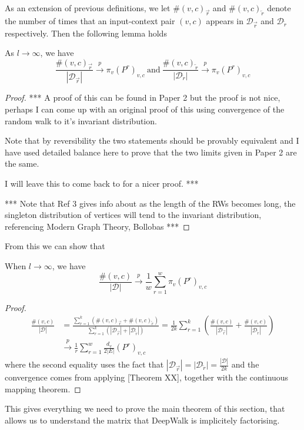 \documentclass[a4paper]{article}
\newcommand{\D}{\mathcal D}
\newcommand{\rar}{\overrightarrow r}
\newcommand{\lar}{\overleftarrow r}
\begin{document}
As an extension of previous definitions, we let $\#(v, c)_{\rar}$ and $\#(v,
c)_{\lar}$ denote the number of times that an input-context pair $(v,c)$ appears
in $\D_{\rar}$ and $\D_{\lar}$ respectively. Then the following lemma holds
\begin{lemma}
  As $l \to \infty$, we have
  \[\frac{\#(v, c)_{\rar}}{|\D_{\rar}|} \overset{p}{\to} \pi_v(P^r)_{v,c} \  \text{and}
    \ \frac{\#(v, c)_{\lar}}{|\D_{\lar}|} \overset{p}{\to} \pi_v(P^r)_{v,c} \]
\end{lemma}
\begin{proof}
  ***
  A proof of this can be found in Paper 2 but the proof is not nice, perhaps I can
  come up with an original proof of this using convergence of the random walk to
  it's invariant distribution.

  Note that by reversibility the two statements should be provably equivalent and
  I have used detailed balance here to prove that the two limits given in Paper 2
  are the same.

  I will leave this to come back to for a nicer proof.
  ***


  *** Note that Ref 3 gives info about as the length of the RWs becomes long, the
  singleton distribution of vertices will tend to the invariant distribution,
  referencing Modern Graph Theory, Bollobas ***
\end{proof}
From this we can show that
\begin{lemma}
  When $l \to \infty$, we have
  \[\frac{\#(v, c)}{|\D|} \overset{p}{\to} \frac{1}{w} \sum_{r = 1}^w \pi_v
    (P^r)_{v,c}\]
\end{lemma}
\begin{proof}
  \begin{align*}
    \frac{\#(v, c)}{|\D|} &=  \frac{\sum_{r=1}^k (\#(v, c)_{\rar} + \#(v, c)_{\lar})}{\sum_{r=1}^k (|\D_{\rar}| + |\D_{\lar}|)} = \frac{1}{2k} \sum_{r=1}^k \left( \frac{\#(v, c)}{|\D_{\rar}|} + \frac{\#(v, c)}{|\D_{\lar}|} \right)\\
                          &\overset{p}{\to} \frac{1}{r}\sum_{r=1}^{w} \frac{d_v}{2|E|}(P^r)_{v, c}
  \end{align*}
  where the second equality uses the fact that $|\D_{\rar}| = |\D_{\lar}| =
  \frac{|\D|}{2k}$ and the convergence comes from applying [Theorem XX],
  together with the continuous mapping theorem.
\end{proof}
This gives everything we need to prove the main theorem of this section, that
allows us to understand the matrix that DeepWalk is implicitely factorising.
\end{document}
